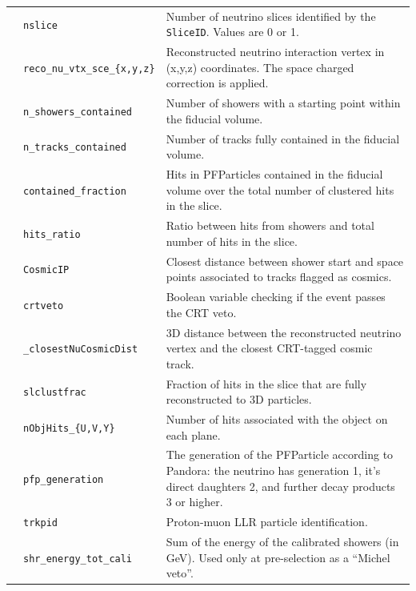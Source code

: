 \begin{table}[ht]
\begin{tabular}{ m{} | m{} | m{}  }
\multicolumn{1}{l|}{} & \texttt{nslice} &  Number of neutrino slices identified by the \texttt{SliceID}. Values are  0 or 1.\\  \cline{2-3}
\multicolumn{1}{l|}{} & \texttt{reco\_nu\_vtx\_sce\_\{x,y,z\}} & Reconstructed neutrino interaction vertex in (x,y,z) coordinates. The space charged correction is applied.  \\  \cline{2-3}
\multicolumn{1}{l|}{} & \texttt{n\_showers\_contained} & Number of showers with a starting point within the fiducial volume. \\  \cline{2-3}
\multicolumn{1}{l|}{} & \texttt{n\_tracks\_contained} & Number of tracks fully contained in the fiducial volume.  \\  \cline{2-3}
\multicolumn{1}{l|}{} & \texttt{contained\_fraction} & Hits in PFParticles contained in the fiducial volume over the total number of clustered hits in the slice.  \\  \cline{2-3}
\parbox[t]{2mm}{} & \texttt{hits\_ratio} & Ratio between hits from showers and total number of hits in the slice. \\  
 & \texttt{CosmicIP} & Closest distance between shower start and space points associated to tracks flagged as cosmics. \\  
 & \texttt{crtveto} & Boolean variable checking if the event passes the CRT veto. \\  
 & \texttt{\_closestNuCosmicDist} &  3D distance between the reconstructed neutrino vertex and the closest CRT-tagged cosmic track. \\  
 & \texttt{slclustfrac} & Fraction of hits in the slice that are fully reconstructed to 3D particles. \\  
 & \texttt{nObjHits\_\{U,V,Y\}} & Number of hits associated with the object on each plane.\\  
\hline
{} & \texttt{pfp\_generation} & The generation of the PFParticle according to Pandora: the neutrino has generation 1, it's direct daughters 2, and further decay products 3 or higher.\\  
 & \texttt{trkpid}  &  Proton-muon LLR particle identification. \\  
\parbox[t]{2mm}{}  & \texttt{shr\_energy\_tot\_cali}  & Sum  of  the  energy  of  the  calibrated  showers  (in  GeV). Used  only  at pre-selection as a ``Michel veto”.\\  

\end{tabular}
\end{table}
